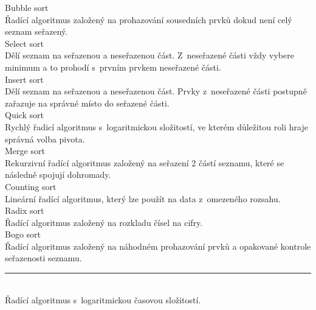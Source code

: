\documentclass[12pt,a4paper]{article}
\begin{document}
\pagestyle{empty}

\setlength\parindent{0pt}
\setlength{\columnsep}{60pt}
\begin{multicols}{2}

\Large

Bubble sort\\

Řadící algoritmus založený na prohazování sousedních prvků dokud není celý
seznam seřazený.\\

Select sort\\

Dělí seznam na seřazenou a neseřazenou část. Z~neseřazené části vždy
vybere minimum a to prohodí s~prvním prvkem neseřazené části.\\

Insert sort\\

Dělí seznam na seřazenou a neseřazenou část. Prvky z~neseřazené části postupně
zařazuje na správné místo do seřazené části.\\

Quick sort\\

Rychlý řadicí algoritmus s~logaritmickou složitostí, ve kterém důležitou roli
hraje správná volba pivota.\\

Merge sort\\

Rekurzivní řadící algoritmus založený na seřazení 2 částí seznamu, které se
následně spojují dohromady.\\

Counting sort\\

Lineární řadící algoritmus, který lze použít na data z~omezeného rozsahu.\\

Radix sort\\

Řadící algoritmus založený na rozkladu čísel na cifry.\\

Bogo sort\\

Řadící algoritmus založený na náhodném prohazování prvků a opakované kontrole
seřazenosti seznamu.\\

\rule{\linewidth}{1pt}\\

Řadící algoritmus s~logaritmickou časovou složitostí.

\end{multicols}
\end{document}
